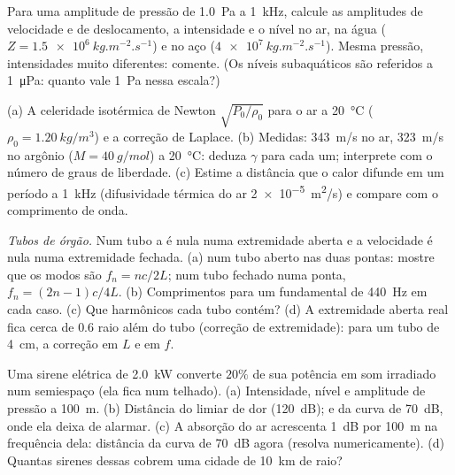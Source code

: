 \begin{exercise}[$\star\star$]\label{exo:b2:sound-waves:6}
Para uma amplitude de pressão de \qty{1.0}{Pa} a \qty{1}{kHz}, calcule as
amplitudes de velocidade e de deslocamento, a intensidade e o nível no
ar, na água ($Z = \qty{1.5e6}{kg.m^{-2}.s^{-1}}$) e no aço
($\qty{4e7}{kg.m^{-2}.s^{-1}}$). Mesma pressão, intensidades muito diferentes:
comente. (Os níveis subaquáticos são referidos a \qty{1}{\micro Pa}: quanto vale
\qty{1}{Pa} nessa escala?)
\end{exercise}

\begin{exercise}[$\star\star$]\label{exo:b2:sound-waves:7}
(a) A celeridade isotérmica de Newton $\sqrt{P_0/\rho_0}$ para o ar a
\qty{20}{\degreeCelsius} ($\rho_0 = \qty{1.20}{kg/m^3}$) e a correção de Laplace.
(b) Medidas: \qty{343}{m/s} no ar, \qty{323}{m/s} no argônio ($M = \qty{40}{g/mol}$)
a \qty{20}{\degreeCelsius}: deduza $\gamma$ para cada um; interprete com o
número de graus de liberdade. (c) Estime a distância que o calor difunde em
um período a \qty{1}{kHz} (difusividade térmica do ar
\qty{2e-5}{m^2/s}) e compare com o comprimento de onda.
\end{exercise}

\begin{exercise}[$\star\star$]\label{exo:b2:sound-waves:8}
\emph{Tubos de órgão.} Num tubo a  é nula numa extremidade aberta
e a velocidade é nula numa extremidade fechada. (a)  num tubo
aberto nas duas pontas: mostre que os modos são $f_n = nc/2L$; num tubo fechado
numa ponta, $f_n = (2n - 1)c/4L$. (b) Comprimentos para um fundamental de \qty{440}{Hz}
em cada caso. (c) Que harmônicos cada tubo contém? (d) A extremidade
aberta real fica cerca de $0.6$ raio além do tubo (correção de extremidade): para
um tubo de \qty{4}{cm}, a correção em $L$ e em $f$.
\end{exercise}

\begin{exercise}[$\star\star$]\label{exo:b2:sound-waves:9}
Uma sirene elétrica de \qty{2.0}{kW} converte $20\%$ de sua potência em som
irradiado num semiespaço (ela fica num telhado). (a) Intensidade, nível
e amplitude de pressão a \qty{100}{m}. (b) Distância do limiar de dor
(\qty{120}{dB}); e da curva de \qty{70}{dB}, onde ela deixa de alarmar.
(c) A absorção do ar acrescenta \qty{1}{dB} por \qty{100}{m} na frequência dela:
distância da curva de \qty{70}{dB} agora (resolva numericamente). (d) Quantas
sirenes dessas cobrem uma cidade de \qty{10}{km} de raio?
\end{exercise}

